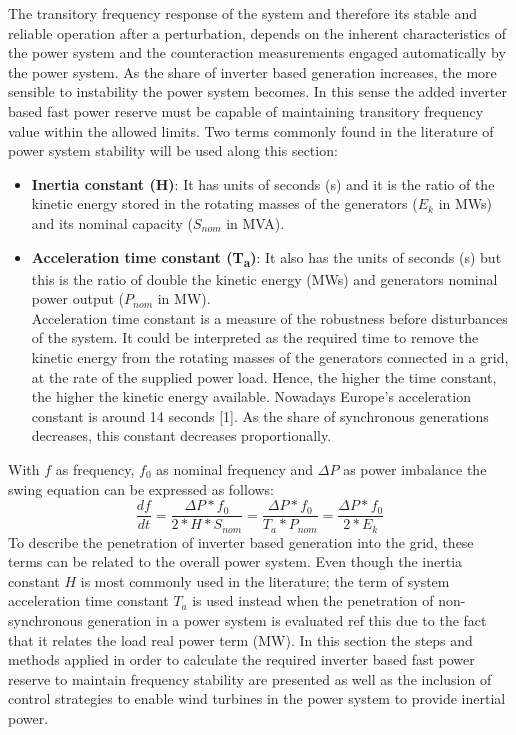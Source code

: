 The transitory frequency response of the system and therefore its stable and reliable operation after a perturbation, depends on the inherent characteristics of the power system and the counteraction measurements engaged automatically by the power system. As the share of inverter based generation increases, the more sensible to instability the power system becomes. In this sense the added inverter based fast power reserve must be capable of maintaining transitory frequency value within the allowed limits. 
Two terms commonly found in the literature of power system stability will be used along this section:

\begin{itemize}[leftmargin=*,labelsep=5.8mm]
	\item \textbf{Inertia constant (H)}: It has units of seconds (s) and it is the ratio of the kinetic energy stored in the rotating masses of the generators ($E_k$ in MWs) and its nominal capacity ($S_{nom}$ in MVA).\\
	\item \textbf{Acceleration time constant (T\textsubscript{a})}: It also has the units of seconds (s) but this is the ratio of double the kinetic energy (MWs) and generators nominal power output ($P_{nom}$ in MW).\\
	 Acceleration time constant is a measure of the robustness before disturbances of the system. It could be interpreted as the required time to remove the kinetic energy from the rotating masses of the generators connected in a grid, at the rate of the supplied power load. Hence, the higher the time constant, the higher the kinetic energy available. Nowadays Europe’s acceleration constant is around 14 seconds [1]. As the share of synchronous generations decreases, this constant decreases proportionally.
\end{itemize}

With $f$ as frequency, $f_0$ as nominal frequency and $\Delta P$ as power imbalance the swing equation can be expressed as follows:
\begin{equation}
	\label{eq:swing}
	\frac{df}{dt}=\dfrac{\Delta P*f_0}{2*H*S_{nom}}=\frac{\Delta P*f_0}{T_a*P_{nom}}=\frac{\Delta P*f_0}{2*E_k}
\end{equation}
To describe the penetration of inverter based generation into the grid, these terms can be related to the overall power system. Even though the inertia constant $H$ is most commonly used in the literature; the term of system acceleration time constant $T_a$ is used instead when the penetration of non-synchronous generation in a power system is evaluated ref this due to the fact that it relates the load real power term (MW). 
In this section the steps and methods applied in order to calculate the required inverter based fast power reserve to maintain frequency stability are presented as well as the inclusion of control strategies to enable wind turbines in the power system to provide inertial power.

